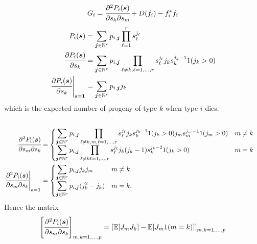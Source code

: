 \documentclass{article}
\begin{document}
\begin{align}
    G_i = \cfrac{\partial^2 P_i(\boldsymbol{s})}{\partial s_k\partial s_m} + D(f_i) - f_i^{*} f_i
\end{align}
\begin{align}
    P_i(\boldsymbol{s}) &= \sum_{\boldsymbol{j} \in \mathbb N^r}p_{i,\boldsymbol{j}}\prod_{\ell=1}^r s_\ell^{j_\ell}
    \\\cfrac{\partial P_i(\boldsymbol{s})}{\partial s_k} &= \sum_{\boldsymbol{j} \in \mathbb N^r}p_{i,\boldsymbol{j}}\prod_{\ell\neq k, \ell=1,...,r} s_\ell^{j_\ell} j_k s_k^{j_k-1}1(j_k>0)
    \\\left.\cfrac{\partial P_i(\boldsymbol{s})}{\partial s_k}\right|_{\boldsymbol{s} = \boldsymbol{1}} &= \sum_{\boldsymbol{j} \in \mathbb N^r}p_{i,\boldsymbol{j}} j_k 
\end{align}
which is the expected number of progeny of type \(k\) when type \(i\) dies.
\begin{align}
    \\\cfrac{\partial^2 P_i(\boldsymbol{s})}{\partial s_m\partial s_k} &= \begin{cases}
        \displaystyle \sum_{\boldsymbol{j} \in \mathbb N^r}p_{i,\boldsymbol{j}}\prod_{\ell\neq k,m, \ell=1,...,r} s_\ell^{j_\ell} j_k s_k^{j_k-1}1(j_k>0)j_m s_m^{j_m-1}1(j_m>0) & m\neq k \\
        \displaystyle \sum_{\boldsymbol{j} \in \mathbb N^r}p_{i,\boldsymbol{j}}\prod_{\ell\neq k \ell=1,...,r} s_\ell^{j_\ell} j_k(j_k-1) s_k^{j_k-2}1(j_k>0) & m=k
    \end{cases}
    \\\left.\cfrac{\partial^2 P_i(\boldsymbol{s})}{\partial s_m\partial s_k}\right|_{\boldsymbol{s} = \boldsymbol{1}} &= \begin{cases}
        \displaystyle \sum_{\boldsymbol{j} \in \mathbb N^r}p_{i,\boldsymbol{j}} j_k j_m & m\neq k \\
        \displaystyle \sum_{\boldsymbol{j} \in \mathbb N^r}p_{i,\boldsymbol{j}} (j_k^2-j_k) & m=k.
    \end{cases}
\end{align}
Hence the matrix 
\[
    \left[\cfrac{\partial^2 P_i(\boldsymbol{s})}{\partial s_m\partial s_k}\right]_{m,k=1,...,p} = \left[\mathbb E[J_mJ_k]-\mathbb E[J_m1(m=k)]\right]_{m,k=1,...,p}
\]
\end{document}

